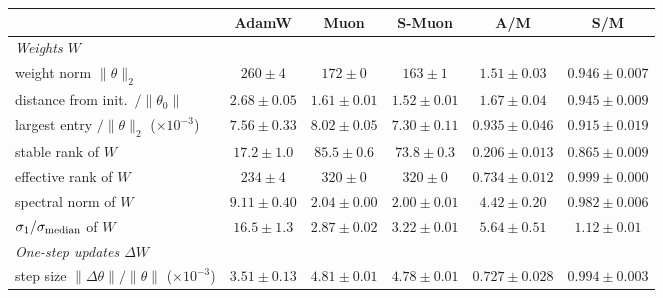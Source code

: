 \begin{center}\small\begin{minipage}{\linewidth}\centering
\captionsetup{type=table}
\caption{All metrics of Step 2 at training loss 0.65, which AdamW reaches near step 4600, Muon near step 2000 and
smoothed Muon (S-Muon) near step 2000: mean $\pm$ half-range over data orders 0--2, and the ratios AdamW/Muon (A/M)
and smoothed Muon/Muon (S/M). If one optimizer's values range over $[a_{\min},a_{\max}]$ and Muon's over
$[b_{\min},b_{\max}]$, the ratio ranges over $[a_{\min}/b_{\max},\,a_{\max}/b_{\min}]$, given as midpoint $\pm$
half-width. Rows marked ($\times10^k$) are in units of $10^k$. Bold: in each ratio column, the five ratios farthest
from 1 whose range excludes 1. At this loss smoothed Muon's early high curvature is still falling (Step 2), which
raises its curvature rows.}
\label{tab:app-am}
\footnotesize\setlength{\tabcolsep}{2.5pt}\setlength{\aboverulesep}{0pt}\setlength{\belowrulesep}{0pt}%
\renewcommand{\arraystretch}{1.15}%
\begin{tabular}{@{}l|ccc|cc@{}}
 & AdamW & Muon & S-Muon & A/M & S/M \\
\midrule
\emph{Weights $W$} & & & & & \\
weight norm $\|\theta\|_2$ & $260 \pm 4$ & $172 \pm 0$ & $163 \pm 1$ & $1.51 \pm 0.03$ & $0.946 \pm 0.007$ \\
distance from init.\ $/\|\theta_0\|$ & $2.68 \pm 0.05$ & $1.61 \pm 0.01$ & $1.52 \pm 0.01$ & $1.67 \pm 0.04$ & $0.945 \pm 0.009$ \\
largest entry $/\|\theta\|_2$ ($\times10^{-3}$) & $7.56 \pm 0.33$ & $8.02 \pm 0.05$ & $7.30 \pm 0.11$ & $0.935 \pm 0.046$ & $0.915 \pm 0.019$ \\
stable rank of $W$ & $17.2 \pm 1.0$ & $85.5 \pm 0.6$ & $73.8 \pm 0.3$ & {\boldmath\textbf{$0.206 \pm 0.013$}} & $0.865 \pm 0.009$ \\
effective rank of $W$ & $234 \pm 4$ & $320 \pm 0$ & $320 \pm 0$ & $0.734 \pm 0.012$ & $0.999 \pm 0.000$ \\
spectral norm of $W$ & $9.11 \pm 0.40$ & $2.04 \pm 0.00$ & $2.00 \pm 0.01$ & $4.42 \pm 0.20$ & $0.982 \pm 0.006$ \\
$\sigma_1/\sigma_{\rm median}$ of $W$ & $16.5 \pm 1.3$ & $2.87 \pm 0.02$ & $3.22 \pm 0.01$ & {\boldmath\textbf{$5.64 \pm 0.51$}} & $1.12 \pm 0.01$ \\
\emph{One-step updates $\Delta W$} & & & & & \\
step size $\|\Delta\theta\|/\|\theta\|$ ($\times10^{-3}$) & $3.51 \pm 0.13$ & $4.81 \pm 0.01$ & $4.78 \pm 0.01$ & $0.727 \pm 0.028$ & $0.994 \pm 0.003$ \\

\end{tabular}
\end{minipage}
\end{center}
